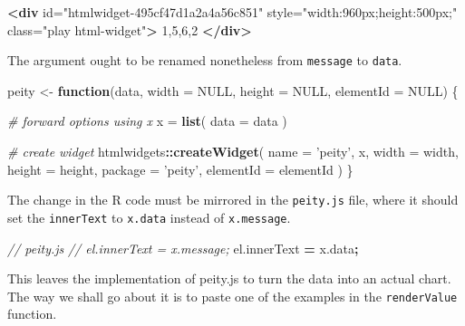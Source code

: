 \documentclass[10pt,]{krantz}
\makeatletter
\newenvironment{Shaded}{\begin{snugshade}}{\end{snugshade}}
\newcommand{\AttributeTok}[1]{\textcolor[rgb]{0.61,0.61,0.61}{#1}}
\newcommand{\CommentTok}[1]{\textcolor[rgb]{0.37,0.37,0.37}{\textit{#1}}}
\newcommand{\ControlFlowTok}[1]{\textcolor[rgb]{0.27,0.27,0.27}{\textbf{#1}}}
\newcommand{\DataTypeTok}[1]{\textcolor[rgb]{0.27,0.27,0.27}{#1}}
\newcommand{\KeywordTok}[1]{\textcolor[rgb]{0.27,0.27,0.27}{\textbf{#1}}}
\newcommand{\NormalTok}[1]{#1}
\newcommand{\OperatorTok}[1]{\textcolor[rgb]{0.43,0.43,0.43}{\textbf{#1}}}
\newcommand{\OtherTok}[1]{\textcolor[rgb]{0.37,0.37,0.37}{#1}}
\newcommand{\StringTok}[1]{\textcolor[rgb]{0.5,0.5,0.5}{#1}}
\newcommand{\VariableTok}[1]{\textcolor[rgb]{0,0,0}{#1}}
\newenvironment{kframe}{%
\medskip{}
\setlength{\fboxsep}{.8em}
 \def\at@end@of@kframe{}%
 \ifinner\ifhmode%
  \def\at@end@of@kframe{\end{minipage}}%
  \begin{minipage}{\columnwidth}%
 \fi\fi%
 \def\FrameCommand##1{\hskip\@totalleftmargin \hskip-\fboxsep
 \colorbox{shadecolor}{##1}\hskip-\fboxsep
     \hskip-\linewidth \hskip-\@totalleftmargin \hskip\columnwidth}%
 \MakeFramed {\advance\hsize-\width
   \@totalleftmargin\z@ \linewidth\hsize
   \@setminipage}}%
 {\par\unskip\endMakeFramed%
 \at@end@of@kframe}
\renewenvironment{Shaded}{\begin{kframe}}{\end{kframe}}
\makeatother
\begin{document}
\begin{Shaded}
\begin{Highlighting}[]
\KeywordTok{<div} 
\OtherTok{  id=}\StringTok{"htmlwidget-495cf47d1a2a4a56c851"} 
\OtherTok{  style=}\StringTok{"width:960px;height:500px;"} 
\OtherTok{  class=}\StringTok{"play html-widget"}\KeywordTok{>}
\NormalTok{  1,5,6,2}
\KeywordTok{</div>}
\end{Highlighting}
\end{Shaded}

The argument ought to be renamed nonetheless from \texttt{message} to \texttt{data}.

\begin{Shaded}
\begin{Highlighting}[]
\NormalTok{peity <-}\StringTok{ }\ControlFlowTok{function}\NormalTok{(data, }\DataTypeTok{width =} \OtherTok{NULL}\NormalTok{, }\DataTypeTok{height =} \OtherTok{NULL}\NormalTok{, }
  \DataTypeTok{elementId =} \OtherTok{NULL}\NormalTok{) \{}

  \CommentTok{# forward options using x}
\NormalTok{  x =}\StringTok{ }\KeywordTok{list}\NormalTok{(}
    \DataTypeTok{data =}\NormalTok{ data}
\NormalTok{  )}

  \CommentTok{# create widget}
\NormalTok{  htmlwidgets}\OperatorTok{::}\KeywordTok{createWidget}\NormalTok{(}
    \DataTypeTok{name =} \StringTok{'peity'}\NormalTok{,}
\NormalTok{    x,}
    \DataTypeTok{width =}\NormalTok{ width,}
    \DataTypeTok{height =}\NormalTok{ height,}
    \DataTypeTok{package =} \StringTok{'peity'}\NormalTok{,}
    \DataTypeTok{elementId =}\NormalTok{ elementId}
\NormalTok{  )}
\NormalTok{\}}
\end{Highlighting}
\end{Shaded}

The change in the R code must be mirrored in the \texttt{peity.js} file, where it should set the \texttt{innerText} to \texttt{x.data} instead of \texttt{x.message}.

\begin{Shaded}
\begin{Highlighting}[]
\CommentTok{// peity.js}
\CommentTok{// el.innerText = x.message;}
\VariableTok{el}\NormalTok{.}\AttributeTok{innerText} \OperatorTok{=} \VariableTok{x}\NormalTok{.}\AttributeTok{data}\OperatorTok{;}
\end{Highlighting}
\end{Shaded}

This leaves the implementation of peity.js to turn the data into an actual chart. The way we shall go about it is to paste one of the examples in the \texttt{renderValue} function.
\end{document}
